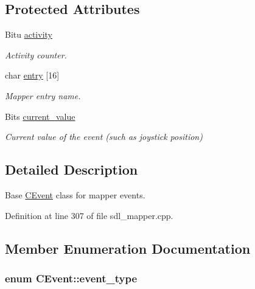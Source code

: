 \subsection*{Protected Attributes}
\begin{DoxyCompactItemize}
\item 
\hypertarget{classCEvent_a487786e4e537594bf963e96aecae85cd}{Bitu \hyperlink{classCEvent_a487786e4e537594bf963e96aecae85cd}{activity}}\label{classCEvent_a487786e4e537594bf963e96aecae85cd}

\begin{DoxyCompactList}\small\item\em Activity counter. \end{DoxyCompactList}\item 
\hypertarget{classCEvent_a20cca21cb3c606f3161a2757c1ba466d}{char \hyperlink{classCEvent_a20cca21cb3c606f3161a2757c1ba466d}{entry} \mbox{[}16\mbox{]}}\label{classCEvent_a20cca21cb3c606f3161a2757c1ba466d}

\begin{DoxyCompactList}\small\item\em Mapper entry name. \end{DoxyCompactList}\item 
\hypertarget{classCEvent_a7bbacdb8e3c5ee41ce13af19dc21db2d}{Bits \hyperlink{classCEvent_a7bbacdb8e3c5ee41ce13af19dc21db2d}{current\-\_\-value}}\label{classCEvent_a7bbacdb8e3c5ee41ce13af19dc21db2d}

\begin{DoxyCompactList}\small\item\em Current value of the event (such as joystick position) \end{DoxyCompactList}\end{DoxyCompactItemize}


\subsection{Detailed Description}
Base \hyperlink{classCEvent}{C\-Event} class for mapper events. 

Definition at line 307 of file sdl\-\_\-mapper.\-cpp.



\subsection{Member Enumeration Documentation}
\hypertarget{classCEvent_a93a65775636793dfcabe38d14739c2bd}{
\subsubsection[{event\-\_\-type}]{\setlength{\rightskip}{0pt plus 5cm}enum {\bf C\-Event\-::event\-\_\-type}}}\label{classCEvent_a93a65775636793dfcabe38d14739c2bd}


